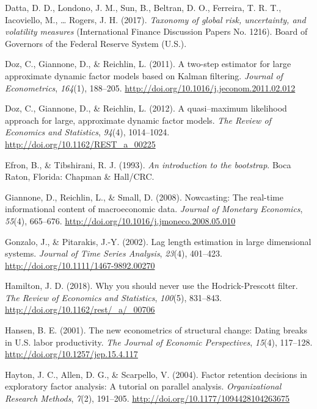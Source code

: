 \documentclass[12pt,twoside]{reedthesis}
\begin{document}
\leavevmode\hypertarget{ref-dattlondsunbeltferriacojahaligiudroge:2017}{}%
Datta, D. D., Londono, J. M., Sun, B., Beltran, D. O., Ferreira, T. R. T., Iacoviello, M., \ldots{} Rogers, J. H. (2017). \emph{Taxonomy of global risk, uncertainty, and volatility measures} (International Finance Discussion Papers No. 1216). Board of Governors of the Federal Reserve System (U.S.).

\leavevmode\hypertarget{ref-dozgianreic:2011}{}%
Doz, C., Giannone, D., \& Reichlin, L. (2011). A two-step estimator for large approximate dynamic factor models based on Kalman filtering. \emph{Journal of Econometrics}, \emph{164}(1), 188--205. \url{http://doi.org/10.1016/j.jeconom.2011.02.012}

\leavevmode\hypertarget{ref-dozgianreic:2012}{}%
Doz, C., Giannone, D., \& Reichlin, L. (2012). A quasi--maximum likelihood approach for large, approximate dynamic factor models. \emph{The Review of Economics and Statistics}, \emph{94}(4), 1014--1024. \url{http://doi.org/10.1162/REST_a_00225}

\leavevmode\hypertarget{ref-efrotibs:1993}{}%
Efron, B., \& Tibshirani, R. J. (1993). \emph{An introduction to the bootstrap}. Boca Raton, Florida: Chapman \& Hall/CRC.

\leavevmode\hypertarget{ref-gianreicsmal:2008}{}%
Giannone, D., Reichlin, L., \& Small, D. (2008). Nowcasting: The real-time informational content of macroeconomic data. \emph{Journal of Monetary Economics}, \emph{55}(4), 665--676. \url{http://doi.org/10.1016/j.jmoneco.2008.05.010}

\leavevmode\hypertarget{ref-gonzpita:2002}{}%
Gonzalo, J., \& Pitarakis, J.-Y. (2002). Lag length estimation in large dimensional systems. \emph{Journal of Time Series Analysis}, \emph{23}(4), 401--423. \url{http://doi.org/10.1111/1467-9892.00270}

\leavevmode\hypertarget{ref-hamilton:2018}{}%
Hamilton, J. D. (2018). Why you should never use the Hodrick-Prescott filter. \emph{The Review of Economics and Statistics}, \emph{100}(5), 831--843. \url{http://doi.org/10.1162/rest/_a/_00706}

\leavevmode\hypertarget{ref-hansen:2001}{}%
Hansen, B. E. (2001). The new econometrics of structural change: Dating breaks in U.S. labor productivity. \emph{The Journal of Economic Perspectives}, \emph{15}(4), 117--128. \url{http://doi.org/10.1257/jep.15.4.117}

\leavevmode\hypertarget{ref-haytallescar:2004}{}%
Hayton, J. C., Allen, D. G., \& Scarpello, V. (2004). Factor retention decisions in exploratory factor analysis: A tutorial on parallel analysis. \emph{Organizational Research Methods}, \emph{7}(2), 191--205. \url{http://doi.org/10.1177/1094428104263675}
\end{document}
